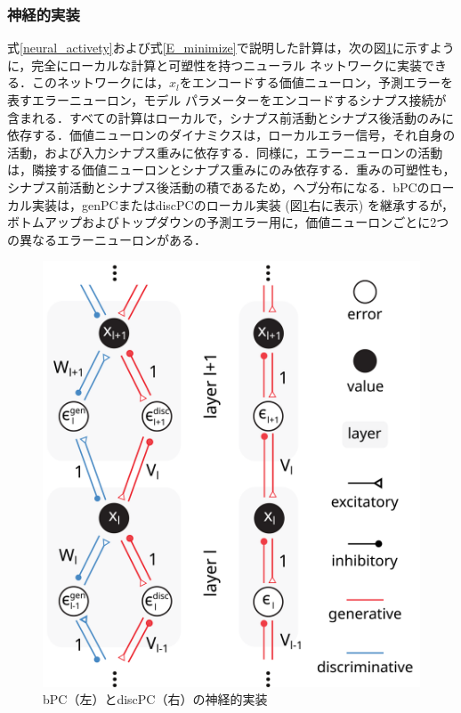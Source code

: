\documentclass[a4paper, titlepage]{jsarticle}
\begin{document}
\subsubsection{神経的実装}
式\eqref{neural_activety}および式\eqref{E_minimize}で説明した計算は，次の図\ref{neural_implementation}に示すように，完全にローカルな計算と可塑性を持つニューラル ネットワークに実装できる．このネットワークには，$x_l$をエンコードする価値ニューロン，予測エラーを表すエラーニューロン，モデル パラメーターをエンコードするシナプス接続が含まれる．すべての計算はローカルで，シナプス前活動とシナプス後活動のみに依存する．価値ニューロンのダイナミクスは，ローカルエラー信号，それ自身の活動，および入力シナプス重みに依存する．同様に，エラーニューロンの活動は，隣接する価値ニューロンとシナプス重みにのみ依存する．重みの可塑性も，シナプス前活動とシナプス後活動の積であるため，ヘブ分布になる．bPCのローカル実装は，genPCまたはdiscPCのローカル実装 (図\ref{neural_implementation}右に表示) を継承するが，ボトムアップおよびトップダウンの予測エラー用に，価値ニューロンごとに2つの異なるエラーニューロンがある．
\begin{figure}[htbp]
   \centering
   \includegraphics[scale=0.13]{x2.png}
   \caption{bPC（左）とdiscPC（右）の神経的実装}
   \label{neural_implementation}
\end{figure}
\end{document}
